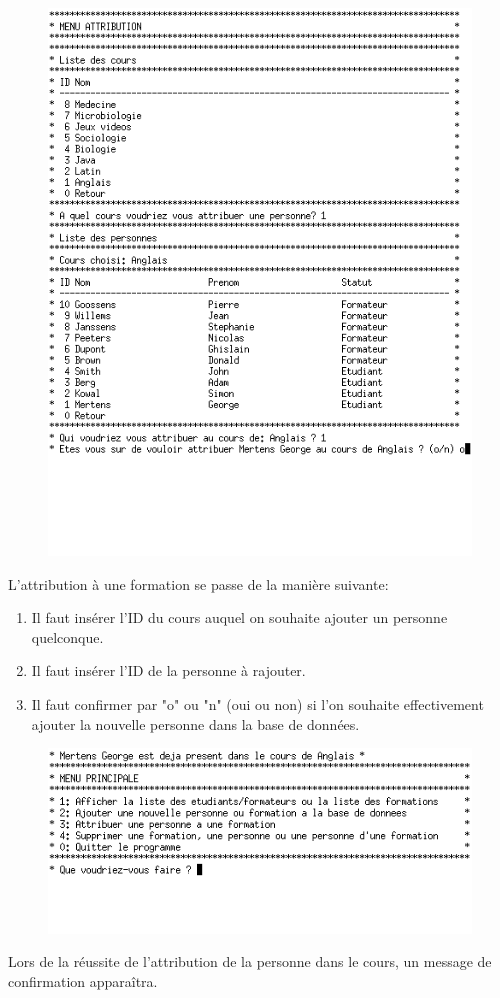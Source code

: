 \documentclass[11pt]{article}
\begin{document}
\newpage
\begin{figure}[ht]
  \centering
  \includegraphics[trim=0 110 0 0, clip, scale=0.8]{images/14.png.png}
\end{figure}
L'attribution à une formation se passe de la manière suivante:
\begin{enumerate}
\item Il faut insérer l'ID du cours auquel on souhaite ajouter un personne quelconque.
\item Il faut insérer l'ID de la personne à rajouter.
\item Il faut confirmer par "o" ou "n" (oui ou non) si l'on souhaite effectivement ajouter la nouvelle personne dans la base de données.
\end{enumerate}

\begin{figure}[ht]
  \centering
  \includegraphics[trim=0 60 0 0, clip, scale=0.8]{images/15.png.png}
\end{figure}
Lors de la réussite de l'attribution de la personne dans le cours, un message de confirmation apparaîtra.
\end{document}
